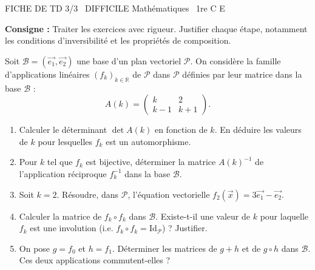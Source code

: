\documentclass[11pt]{article}
\begin{document}
\begin{tcolorbox}[enhanced,colback=popink,colframe=popink,arc=10pt,boxrule=0pt,left=12pt,right=12pt,top=9pt,bottom=9pt]
{\color{white}\popxbold\small FICHE DE TD 3/3 \textbullet\ DIFFICILE \hfill Mathématiques \textbullet\ 1re C E\par}
\end{tcolorbox}
\vspace{4pt}
\noindent \textbf{Consigne :} Traiter les exercices avec rigueur. Justifier chaque étape, notamment les conditions d'inversibilité et les propriétés de composition.

\begin{exercice}
Soit $\mathcal{B}=(\vec{e_1},\vec{e_2})$ une base d'un plan vectoriel $\mathcal{P}$. On considère la famille d'applications linéaires $(f_k)_{k \in \mathbb{R}}$ de $\mathcal{P}$ dans $\mathcal{P}$ définies par leur matrice dans la base $\mathcal{B}$ :
\[
A(k) = \begin{pmatrix}
k & 2 \\
k-1 & k+1
\end{pmatrix}.
\]
\begin{enumerate}
    \item Calculer le déterminant $\det A(k)$ en fonction de $k$. En déduire les valeurs de $k$ pour lesquelles $f_k$ est un automorphisme.
    \item Pour $k$ tel que $f_k$ est bijective, déterminer la matrice $A(k)^{-1}$ de l'application réciproque $f_k^{-1}$ dans la base $\mathcal{B}$.
    \item Soit $k=2$. Résoudre, dans $\mathcal{P}$, l'équation vectorielle $f_2(\vec{x}) = 3\vec{e_1} - \vec{e_2}$.
    \item Calculer la matrice de $f_k \circ f_k$ dans $\mathcal{B}$. Existe-t-il une valeur de $k$ pour laquelle $f_k$ est une involution (i.e. $f_k \circ f_k = \text{Id}_{\mathcal{P}}$) ? Justifier.
    \item On pose $g = f_0$ et $h = f_1$. Déterminer les matrices de $g+h$ et de $g \circ h$ dans $\mathcal{B}$. Ces deux applications commutent-elles ?
\end{enumerate}
\end{exercice}
\end{document}
